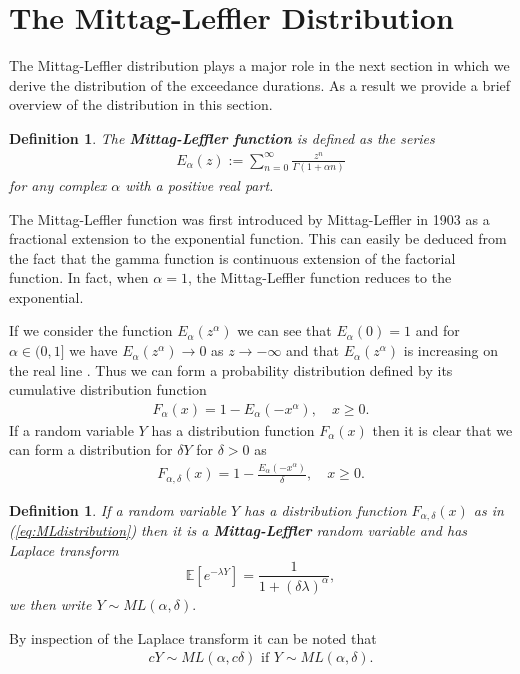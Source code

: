 \documentclass[honours,12pt,twoside, openright]{unswthesis}
\newcommand{\E}{\mathbb{E}}
\newcommand{\1}{\mathbf 1}
\newtheorem{definition}[equation]{Definition}
\numberwithin{equation}{section}
\theoremstyle{definition}
\theoremstyle{remark}
\begin{document}
\section{The Mittag-Leffler Distribution}
The Mittag-Leffler distribution plays a major role in the next section in which we derive the distribution of the exceedance durations. As a result we provide a brief overview of the distribution in this section.
\begin{definition}\cite{Lin1998}
	The \textbf{Mittag-Leffler function} is defined as the series
	\begin{align*}
		E_\alpha(z):=\sum_{n=0}^\infty \frac{z^n}{\Gamma(1+\alpha n)}
	\end{align*}
	for any complex $\alpha$ with a positive real part.
\end{definition}
The Mittag-Leffler function was first introduced by Mittag-Leffler in 1903 as a fractional extension to the exponential function. This can easily be deduced from the fact that the gamma function is continuous extension of the factorial function. In fact, when $\alpha=1$, the Mittag-Leffler function reduces to the exponential.

If we consider the function $E_\alpha(z^\alpha)$ we can see that $E_\alpha(0)=1$ and for $\alpha \in (0,1]$ we have $E_\alpha(z^\alpha)\to0$ as $z\to-\infty$ \cite{Pillai1990} and that $E_\alpha(z^\alpha)$ is increasing on the real line \cite[Th~1]{Lin1998}. Thus we can form a probability distribution defined by its cumulative distribution function
\begin{align}
	F_\alpha(x)=1-E_\alpha(-x^\alpha),\quad x\geq0.
\end{align}
If a random variable $Y$ has a distribution function $F_\alpha(x)$ then it is clear that we can form a distribution for $\delta Y$ for $\delta>0$ as
\begin{align}\label{eq:MLdistribution}
	F_{\alpha,\delta}(x)=1-\frac{E_\alpha(-x^\alpha)}{\delta},\quad x\geq0.
\end{align}
\begin{definition}\label{def:MLlaplace}
	If a random variable $Y$ has a distribution function $F_{\alpha,\delta}(x)$ as in (\ref{eq:MLdistribution}) then it is a \textbf{Mittag-Leffler} random variable and has Laplace transform
	\[
		\E[e^{-\lambda Y}]=\frac{1}{1+(\delta\lambda)^\alpha},
	\]
	we then write $Y\sim ML(\alpha,\delta).$
\end{definition}
\noindent By inspection of the Laplace transform it can be noted that 
\begin{align}\label{eq:MLscale}
 cY\sim ML(\alpha,c\delta)\textrm{ if }Y\sim ML(\alpha,\delta).
\end{align}
\end{document}
